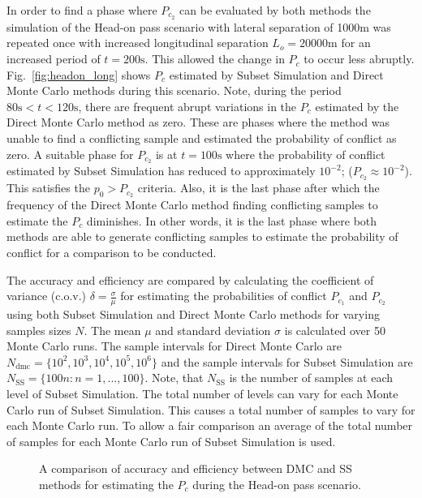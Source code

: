 \documentclass[journal]{IEEEtran}
\begin{document}
In order to find a phase where $P_{c_{2}}$ can be evaluated by both methods the simulation of the Head-on pass scenario with lateral separation of 1000m was repeated once with increased longitudinal separation $L_{o} = 20000\text{m}$ for an increased period of $t = 200\text{s}$. This allowed the change in $P_{c}$ to occur less abruptly. Fig.~\ref{fig:headon_long} shows $P_{c}$ estimated by Subset Simulation and Direct Monte Carlo methods during this scenario. Note, during the period $80\text{s} < t < 120\text{s}$, there are frequent abrupt variations in the $P_{c}$ estimated by the Direct Monte Carlo method as zero. These are phases where the method was unable to find a conflicting sample and estimated the probability of conflict as zero. A suitable phase for $P_{c_{2}}$ is at $t = 100\text{s}$ where the probability of conflict estimated by Subset Simulation has reduced to approximately $10^{-2}$; ($P_{c_{2}} \approx 10^{-2}$). This satisfies the $p_{0} > P_{c_{2}}$ criteria. Also, it is the last phase after which the frequency of the Direct Monte Carlo method finding conflicting samples to estimate the $P_{c}$ diminishes. In other words, it is the last phase where both methods are able to generate conflicting samples to estimate the probability of conflict for a comparison to be conducted.

The accuracy and efficiency are compared by calculating the coefficient of variance (c.o.v.) $\delta = \frac{\sigma}{\mu}$ for estimating the probabilities of conflict $P_{c_{1}}$ and $P_{c_{2}}$ using both Subset Simulation and Direct Monte Carlo methods for varying samples sizes $N$. The mean $\mu$ and standard deviation $\sigma$ is calculated over 50 Monte Carlo runs. The sample intervals for Direct Monte Carlo are $N_{\text{dmc}} = \{10^{2}, 10^{3}, 10^{4}, 10^{5}, 10^{6}\}$ and the sample intervals for Subset Simulation are $N_{\text{SS}} = \{100n: n = 1,...,100\}$. Note, that $N_{\text{SS}}$ is the number of samples at each level of Subset Simulation. The total number of levels can vary for each Monte Carlo run of Subset Simulation. This causes a total number of samples to vary for each Monte Carlo run. To allow a fair comparison an average of the total number of samples for each Monte Carlo run of Subset Simulation is used. 



\begin{figure*}\centering	
	\hfill
	\hfill
	\caption{A comparison of accuracy and efficiency between DMC and SS methods for estimating the $P_{c}$ during the Head-on pass scenario.}
	\label{fig:headonpass_1100m_snapshot}	
\end{figure*}
\end{document}
